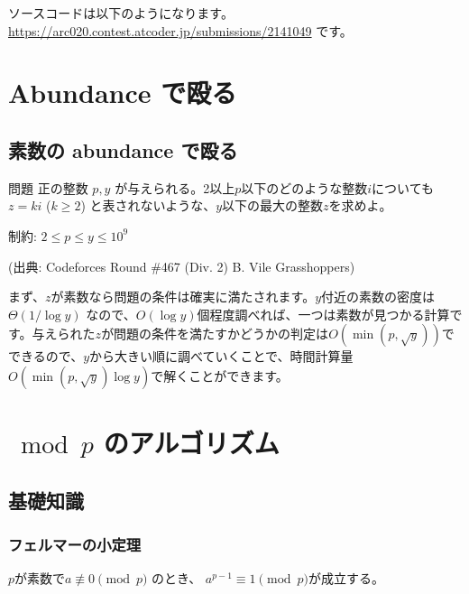 \documentclass{jsarticle}
\begin{document}
  ソースコードは以下のようになります。\url{https://arc020.contest.atcoder.jp/submissions/2141049} です。
  
 \section{Abundance で殴る}
  \subsection{素数の abundance で殴る}
  \label{subsec:abundance-of-prime-numbers}
  \begin{itembox}[l]{問題}
   正の整数 $p,y$ が与えられる。2以上$p$以下のどのような整数$i$についても$z = ki$ ($k \ge 2$) と表されないような、$y$以下の最大の整数$z$を求めよ。

   制約: $2 \le p \le y \le 10^9$

   (出典: Codeforces Round \#467 (Div. 2) B. Vile Grasshoppers)
  \end{itembox}
  まず、$z$が素数なら問題の条件は確実に満たされます。$y$付近の素数の密度は$\Theta(1/\log y)$ なので、$O(\log y)$個程度調べれば、一つは素数が見つかる計算です。与えられた$z$が問題の条件を満たすかどうかの判定は$O(\min(p, \sqrt{y}))$でできるので、$y$から大きい順に調べていくことで、時間計算量$O(\min(p, \sqrt{y})\log y)$で解くことができます。
 \section{${}\bmod p$ のアルゴリズム}
  \subsection{基礎知識}
  \label{subsec:group-preliminaries}
   \subsubsection{フェルマーの小定理}
   \begin{theorem}
    \label{thm:fermats-little-theorem}
    $p$が素数で$a \not \equiv 0 \pmod p$ のとき、 $a^{p-1} \equiv 1 \pmod p$が成立する。
   \end{theorem}
\end{document}
